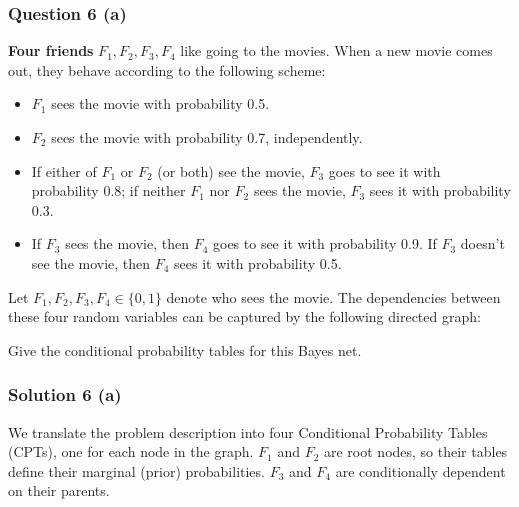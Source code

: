 \documentclass{article}
\begin{document}
\subsubsection*{Question 6 (a)}
\begin{flushleft}
    \textbf{Four friends} $F_1, F_2, F_3, F_4$ like going to the movies. 
    When a new movie comes out, they behave according to the following scheme: 
    \begin{itemize}
    \item $F_1$ sees the movie with probability 0.5. 
    \item $F_2$ sees the movie with probability 0.7, independently. 
    \item If either of $F_1$ or $F_2$ (or both) see the movie, $F_3$ goes to see it with probability 0.8; 
    if neither $F_1$ nor $F_2$ sees the movie, $F_3$ sees it with probability 0.3. 
    \item If $F_3$ sees the movie, then $F_4$ goes to see it with probability 0.9. 
    If $F_3$ doesn't see the movie, then $F_4$ sees it with probability 0.5. 
    \end{itemize}

    Let $F_1, F_2, F_3, F_4 \in \{0,1\}$ denote who sees the movie. 
    The dependencies between these four random variables can be captured by the following directed graph: 

    \begin{center}
    \end{center}

    Give the conditional probability tables for this Bayes net. 
\end{flushleft}

\subsubsection*{Solution 6 (a)}
We translate the problem description into four Conditional Probability Tables (CPTs), one for each node in the graph. $F_1$ and $F_2$ are root nodes, so their tables define their marginal (prior) probabilities. $F_3$ and $F_4$ are conditionally dependent on their parents.
\end{document}
